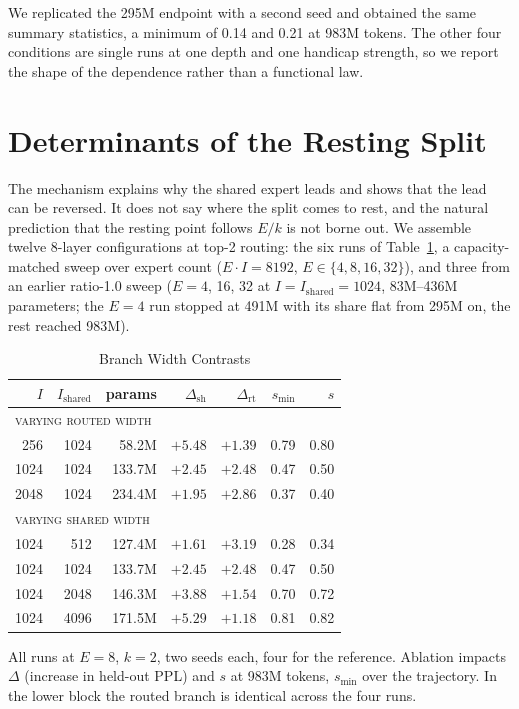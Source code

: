 \documentclass[conference,11pt]{IEEEtran}
\newcommand{\tabnote}[1]{\vspace{5pt}\parbox{\columnwidth}{\footnotesize #1}}
\begin{document}
We replicated the 295M endpoint with a second seed and obtained the same summary statistics, a
minimum of 0.14 and 0.21 at 983M tokens. The other four conditions are single runs at one depth
and one handicap strength, so we report the shape of the dependence rather than a functional law.

\section{Determinants of the Resting Split}
\label{sec:ratio}

The mechanism explains why the shared expert leads and shows that the lead can be reversed. It
does not say where the split comes to rest, and the natural prediction that the resting point
follows $E/k$ is not borne out. We assemble twelve 8-layer configurations at top-2 routing: the
six runs of Table~\ref{tab:contrast}, a capacity-matched sweep over expert count ($E\cdot I =
8192$, $E\in\{4,8,16,32\}$), and three from an earlier ratio-1.0 sweep ($E = 4$, 16, 32 at
$I=I_{\mathrm{shared}}=1024$, 83M--436M parameters; the $E=4$ run stopped at 491M with its share
flat from 295M on, the rest reached 983M).

\begin{table}[t]
\centering
\caption{Branch Width Contrasts}
\label{tab:contrast}
\vspace{4pt}
\footnotesize
\setlength{\tabcolsep}{3.5pt}
\begin{tabular}{rrrrrrr}
\toprule
$I$ & $I_{\mathrm{shared}}$ & params & $\Delta_{\mathrm{sh}}$ & $\Delta_{\mathrm{rt}}$ & $s_{\min}$ & $s$ \\
\midrule
\multicolumn{7}{l}{\textsc{varying routed width}}\\
256  & 1024 & 58.2M  & $+5.48$ & $+1.39$ & 0.79 & 0.80 \\
1024 & 1024 & 133.7M & $+2.45$ & $+2.48$ & 0.47 & 0.50 \\
2048 & 1024 & 234.4M & $+1.95$ & $+2.86$ & 0.37 & 0.40 \\
\midrule
\multicolumn{7}{l}{\textsc{varying shared width}}\\
1024 & 512  & 127.4M & $+1.61$ & $+3.19$ & 0.28 & 0.34 \\
1024 & 1024 & 133.7M & $+2.45$ & $+2.48$ & 0.47 & 0.50 \\
1024 & 2048 & 146.3M & $+3.88$ & $+1.54$ & 0.70 & 0.72 \\
1024 & 4096 & 171.5M & $+5.29$ & $+1.18$ & 0.81 & 0.82 \\
\bottomrule
\end{tabular}
\tabnote{All runs at $E{=}8$, $k{=}2$, two seeds each, four for the reference. Ablation impacts
$\Delta$ (increase in held-out PPL) and $s$ at 983M tokens, $s_{\min}$ over the trajectory. In the
lower block the routed branch is identical across the four runs.}
\end{table}
\end{document}

